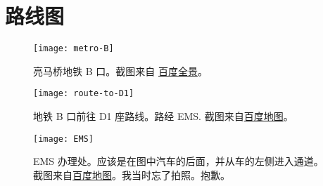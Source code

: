 \section{路线图}
\begin{figure}[htbp]
  \centering
  \texttt{[image: metro-B]}
  \caption[亮马桥地铁 B 口]{亮马桥地铁 B 口。截图来自 \href{https://map.baidu.com/\#panoid=09002200121707010630058282I\&panotype=street\&heading=0.64\&pitch=-4.92\&l=19\&tn=B_NORMAL_MAP\&sc=0\&newmap=1\&shareurl=1\&pid=09002200121707010630058282I}{百度全景}。}
  \label{fig:real}
\end{figure}
\begin{figure}
  \centering
  \texttt{[image: route-to-D1]}
  \caption[地铁 B 口前往 D1 座路线]{地铁 B 口前往 D1 座路线。路经 EMS. 截图来自\href{https://map.baidu.com/}{百度地图}。}
  \label{fig:route}
\end{figure}
\begin{figure}
  \centering
  \texttt{[image: EMS]}
  \caption[EMS 办理处]{EMS 办理处。应该是在图中汽车的后面，并从车的左侧进入通道。截图来自\href{https://map.baidu.com/\#panoid=09002200121707010635276742I\&panotype=street\&heading=274.99\&pitch=-2.29\&l=12\&tn=B_NORMAL_MAP\&sc=0\&newmap=1\&shareurl=1\&pid=09002200121707010635276742I}{百度地图}。我当时忘了拍照。抱歉。}
  \label{fig:EMS}
\end{figure}